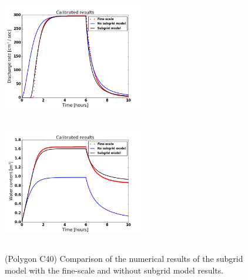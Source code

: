 \documentclass[review,11pt]{elsarticle}
\begin{document}
\begin{figure}
\centering
\includegraphics[width=6.2cm, height=5.5cm]{./figures/POLYGON40/POLYGON40dischargeCalibManning.png}
\includegraphics[width=6.2cm, height=5.5cm]{./figures/POLYGON40/POLYGON40watercontentCalibManning.png}
\caption{(Polygon C40) Comparison of the numerical results of the subgrid model with the fine-scale and without subgrid model results.}
\label{polygon-C40}
\end{figure}
\end{document}
